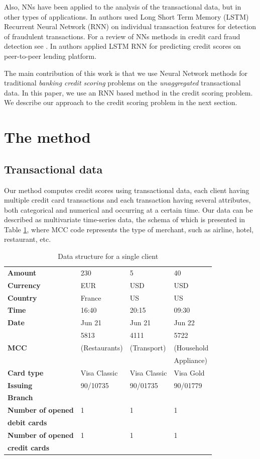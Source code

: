 \documentclass[sigconf]{acmart}
\begin{document}
Also, NNs have been applied to the analysis of the transactional data, but in other types of applications. In \cite{fraud_lstm} authors used Long Short Term Memory (LSTM) Recurrent Neural Network (RNN) \cite{gers1999learning} on individual transaction features for detection of fraudulent transactions. For a review of NNs methods in credit card fraud detection see \cite{abdallah2016fraud}. In \cite{zhang2017credit}  authors applied LSTM RNN for predicting credit scores on peer-to-peer lending platform.

The main contribution of this work is that we use Neural Network methods for traditional {\em banking credit scoring} problems on the {\em unaggregated} transactional data. 
In this paper, we use an RNN based method in the credit scoring problem. We describe our approach to the credit scoring problem in the next section.

\section{The method}

\subsection{Transactional data}

Our method computes credit scores using transactional data,
each client having multiple credit card transactions and each transaction having several attributes, both categorical and numerical and occurring at a certain time. Our data can be described as multivariate time-series data, the schema of which is presented in Table \ref{tab-tr-data}, where MCC code represents the type of merchant, such as airline, hotel, restaurant, etc.

\begin{table}[ht]
\caption{Data structure for a single client}
\begin{tabular}{ | l |  l l l | }
\hline
\textbf{Amount} & 230 & 5 & 40 \\
\textbf{Currency} & EUR & USD & USD \\
\textbf{Country} & France & US & US \\
\textbf{Time} & 16:40 & 20:15 & 09:30 \\
\textbf{Date} & Jun 21 & Jun 21 & Jun 22 \\
 & 5813 & 4111 & 5722 \\
\textbf{MCC} & (Restaurants) & (Transport) & (Household \\
&  &  & Appliance) \\
\textbf{Card type} & Visa Classic & Visa Classic & Visa Gold \\
\textbf{Issuing} & 90/10735 & 90/01735 & 90/01779 \\
\textbf{Branch} &&& \\
\textbf{Number of opened} & 1 & 1& 1 \\
\textbf{debit cards} &&& \\
\textbf{Number of opened} & 1 & 1& 1 \\
\textbf{credit cards} &&& \\
\hline
\end{tabular}
\label{tab-tr-data}
\end{table}
\end{document}
